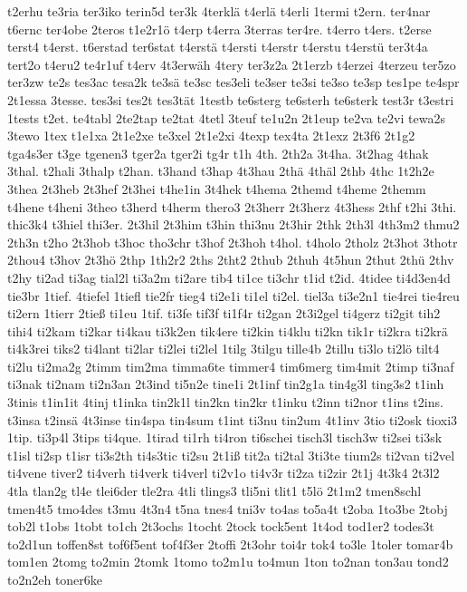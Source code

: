{t2erhu
te3ria
ter3iko
terin5d
ter3k
4terklä
t4erlä
t4erli
1termi
t2ern.
ter4nar
t6ernc
ter4obe
2teros
t1e2r1ö
t4erp
t4erra
3terras
ter4re.
t4erro
t4ers.
t2erse
terst4
t4erst.
t6erstad
ter6stat
t4erstä
t4ersti
t4erstr
t4erstu
t4erstü
ter3t4a
tert2o
t4eru2
te4r1uf
t4erv
4t3erwäh
4tery
ter3z2a
2t1erzb
t4erzei
4terzeu
ter5zo
ter3zw
te2s
tes3ac
tesa2k
te3sä
te3sc
tes3eli
te3ser
te3si
te3so
te3sp
tes1pe
te4spr
2t1essa
3tesse.
tes3si
tes2t
tes3tät
1testb
te6sterg
te6sterh
te6sterk
test3r
t3estri
1tests
t2et.
te4tabl
2te2tap
te2tat
4tetl
3teuf
te1u2n
2t1eup
te2va
te2vi
tewa2s
3tewo
1tex
t1e1xa
2t1e2xe
te3xel
2t1e2xi
4texp
tex4ta
2t1exz
2t3f6
2t1g2
tga4s3er
t3ge
tgenen3
tger2a
tger2i
tg4r
t1h
4th.
2th2a
3t4ha.
3t2hag
4thak
3thal.
t2hali
3thalp
t2han.
t3hand
t3hap
4t3hau
2thä
4thäl
2thb
4thc
1t2h2e
3thea
2t3heb
2t3hef
2t3hei
t4he1in
3t4hek
t4hema
2themd
t4heme
2themm
t4hene
t4heni
3theo
t3herd
t4herm
thero3
2t3herr
2t3herz
4t3hess
2thf
t2hi
3thi.
thic3k4
t3hiel
thi3er.
2t3hil
2t3him
t3hin
thi3nu
2t3hir
2thk
2th3l
4th3m2
thmu2
2th3n
t2ho
2t3hob
t3hoc
tho3chr
t3hof
2t3hoh
t4hol.
t4holo
2tholz
2t3hot
3thotr
2thou4
t3hov
2t3hö
2thp
1th2r2
2ths
2tht2
2thub
2thuh
4t5hun
2thut
2thü
2thv
t2hy
ti2ad
ti3ag
tial2l
ti3a2m
ti2are
tib4
ti1ce
ti3chr
t1id
t2id.
4tidee
ti4d3en4d
tie3br
1tief.
4tiefel
1tiefl
tie2fr
tieg4
ti2e1i
ti1el
ti2el.
tiel3a
ti3e2n1
tie4rei
tie4reu
ti2ern
1tierr
2tieß
ti1eu
1tif.
ti3fe
tif3f
ti1f4r
ti2gan
2t3i2gel
ti4gerz
ti2git
tih2
tihi4
ti2kam
ti2kar
ti4kau
ti3k2en
tik4ere
ti2kin
ti4klu
ti2kn
tik1r
ti2kra
ti2krä
ti4k3rei
tiks2
ti4lant
ti2lar
ti2lei
ti2lel
1tilg
3tilgu
tille4b
2tillu
ti3lo
ti2lö
tilt4
ti2lu
ti2ma2g
2timm
tim2ma
timma6te
timmer4
tim6merg
tim4mit
2timp
ti3naf
ti3nak
ti2nam
ti2n3an
2t3ind
ti5n2e
tine1i
2t1inf
tin2g1a
tin4g3l
ting3s2
t1inh
3tinis
t1in1it
4tinj
t1inka
tin2k1l
tin2kn
tin2kr
t1inku
t2inn
ti2nor
t1ins
t2ins.
t3insa
t2insä
4t3inse
tin4spa
tin4sum
t1int
ti3nu
tin2um
4t1inv
3tio
ti2osk
tioxi3
1tip.
ti3p4l
3tips
ti4que.
1tirad
ti1rh
ti4ron
ti6schei
tisch3l
tisch3w
ti2sei
ti3sk
t1isl
ti2sp
t1isr
ti3s2th
ti4s3tic
ti2su
2t1iß
tit2a
ti2tal
3ti3te
tium2s
ti2van
ti2vel
ti4vene
tiver2
ti4verh
ti4verk
ti4verl
ti2v1o
ti4v3r
ti2za
ti2zir
2t1j
4t3k4
2t3l2
4tla
tlan2g
tl4e
tlei6der
tle2ra
4tli
tlings3
tli5ni
tlit1
t5lö
2t1m2
tmen8schl
tmen4t5
tmo4des
t3mu
4t3n4
t5na
tnes4
tni3v
to4as
to5a4t
t2oba
1to3be
2tobj
tob2l
t1obs
1tobt
to1ch
2t3ochs
1tocht
2tock
tock5ent
1t4od
tod1er2
todes3t
to2d1un
toffen8st
tof6f5ent
tof4f3er
2toffi
2t3ohr
toi4r
tok4
to3le
1toler
tomar4b
tom1en
2tomg
to2min
2tomk
1tomo
to2m1u
to4mun
1ton
to2nan
ton3au
tond2
to2n2eh
toner6ke
}
